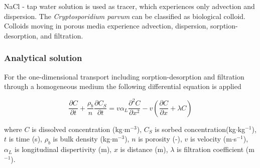 NaCl - tap water solution is used as tracer, which experiences only advection and dispersion. The \emph{Cryptosporidium parvum} can be classified as biological colloid. Colloids moving in porous media experience advection, dispersion, sorption-desorption, and filtration.

\subsubsection{Analytical solution}

For the one-dimensional transport including sorption-desorption and filtration through a homogeneous medium the following differential equation is applied

\begin{equation}\label{colloid transeq}
\frac{\partial C}{\partial t} + \frac{\rho_b}{n} \frac{\partial C_S}{\partial t} = v \alpha_L \frac{\partial^2 C}{\partial x^2} - v (\frac{\partial C}{\partial x} + \lambda C)
\end{equation}

where $C$ is dissolved concentration (kg$\cdot$m$^{-3}$), $C_S$ is sorbed concentration(kg$\cdot$kg$^{-1}$), $t$ is time (s), $\rho_b$ is bulk density (kg$\cdot$m$^{-3}$), $n$ is porosity (-), $v$ is velocity (m$\cdot$s$^{-1}$), $\alpha_L$ is longitudinal dispertivity (m), $x$ is distance (m), $\lambda$ is filtration coefficient (m$^{-1}$).

